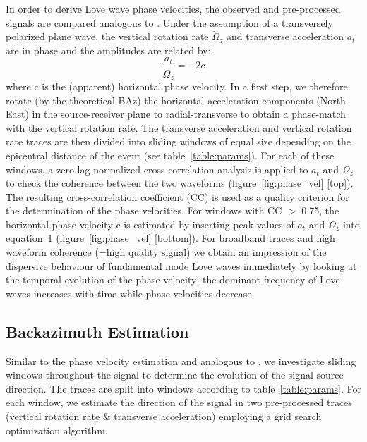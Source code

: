 \documentclass[12pt,reqno,letter]{article}
\begin{document}
In order to derive Love wave phase velocities, the observed and pre-processed signals are compared analogous to \cite{Igel2005}. Under the assumption of a transversely polarized plane wave, the vertical rotation rate $\dot{\Omega}_z$ and transverse acceleration $a_t$ are in phase and the amplitudes are related by: 
\begin{equation}
	\frac{a_t}{\dot{\Omega}_z} = -2c
\end{equation}
where c is the (apparent) horizontal phase velocity. In a first step, we therefore rotate (by the theoretical BAz) the horizontal acceleration components (North-East) in the source-receiver plane to radial-transverse to obtain a phase-match with the vertical rotation rate. The transverse acceleration and vertical rotation rate traces are then divided into sliding windows of equal size depending on the epicentral distance of the event (see table~\ref{table:params}).
For each of these windows, a zero-lag normalized cross-correlation analysis is applied to $a_t$ and $\dot{\Omega}_z$ to check the coherence between the two waveforms (figure~\ref{fig:phase_vel} [top]). The resulting cross-correlation coefficient (CC) is used as a quality criterion for the determination of the phase velocities. For windows with CC $>$ 0.75, the horizontal phase velocity c is estimated by inserting peak values of $a_t$ and $\dot{\Omega}_z$ into equation~1 (figure~\ref{fig:phase_vel} [bottom]).
For broadband traces and high waveform coherence (=high quality signal) we  obtain an impression of the dispersive behaviour of fundamental mode Love waves immediately by looking at the temporal evolution of the phase velocity:  the dominant frequency of Love waves increases with time while phase velocities decrease.

\subsection*{Backazimuth Estimation}
\label{subsec:be}
Similar to the phase velocity estimation and analogous to \cite{Igel2007}, we investigate sliding windows throughout the signal to determine the evolution of the signal source direction. The traces are split into windows according to table~\ref{table:params}.
For each window, we estimate the direction of the signal in two pre-processed traces (vertical rotation rate \& transverse acceleration) employing a grid search optimization algorithm. 
%
\end{document}
